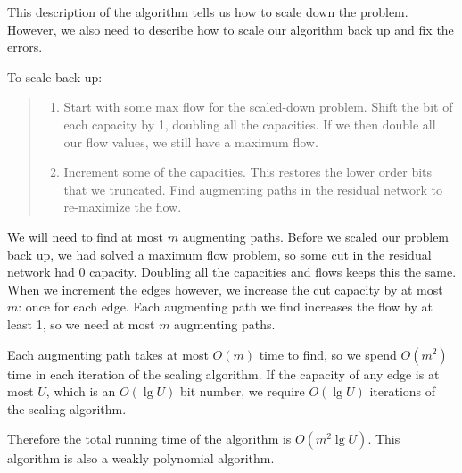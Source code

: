 \documentclass{article}
\begin{document}
This description of the algorithm tells us how to scale down the
problem.  However, we also need to describe how to scale our algorithm
back up and fix the errors.

To scale back up:

\begin{quote}
\begin{enumerate}
\item
Start with some max flow for the scaled-down problem.  Shift the
bit of each capacity by 1, doubling all the capacities.  If we then
double all our flow values, we still have a maximum flow.
\item
Increment some of the capacities.  This restores the lower order bits
that we truncated.  Find augmenting paths in the residual network to
re-maximize the flow.
\end{enumerate}
\end{quote}


We will need to find at most $m$ augmenting paths.  Before we scaled
our problem back up, we had solved a maximum flow problem, so some cut
in the residual network had 0 capacity.  Doubling all the capacities
and flows keeps this the same.  When we increment the edges however,
we increase the cut capacity by at most $m$: once for each edge.
Each augmenting path we find increases the flow by at least 1, so we
need at most $m$ augmenting paths.

Each augmenting path takes at most $O(m)$ time to find, so we spend
$O(m^2)$ time in each iteration of the scaling algorithm.  If the
capacity of any edge is at most $U$, which is an $O(\lg U)$ bit
number, we require $O(\lg U)$ iterations of the scaling
algorithm.

Therefore the total running time of the algorithm is $O(m^2 \lg U)$.
This algorithm is also a weakly polynomial algorithm.
\end{document}
